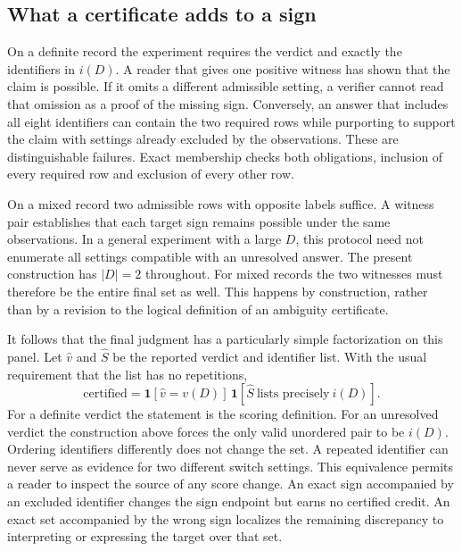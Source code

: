 \documentclass[12pt,letterpaper]{article}
\begin{document}
\subsection{What a certificate adds to a sign}

On a definite record the experiment requires the verdict and exactly the identifiers in $i(D)$. A reader that gives one positive witness has shown that the claim is possible. If it omits a different admissible setting, a verifier cannot read that omission as a proof of the missing sign. Conversely, an answer that includes all eight identifiers can contain the two required rows while purporting to support the claim with settings already excluded by the observations. These are distinguishable failures. Exact membership checks both obligations, inclusion of every required row and exclusion of every other row.

On a mixed record two admissible rows with opposite labels suffice. A witness pair establishes that each target sign remains possible under the same observations. In a general experiment with a large $D$, this protocol need not enumerate all settings compatible with an unresolved answer. The present construction has $|D|=2$ throughout. For mixed records the two witnesses must therefore be the entire final set as well. This happens by construction, rather than by a revision to the logical definition of an ambiguity certificate.

It follows that the final judgment has a particularly simple factorization on this panel. Let $\widehat v$ and $\widehat S$ be the reported verdict and identifier list. With the usual requirement that the list has no repetitions,
\begin{equation}
 \mathrm{certified}
  =\mathbf 1[\widehat v=v(D)]\,\mathbf 1[\widehat S\ \text{lists precisely}\ i(D)] .
 \label{eq:factor}
\end{equation}
For a definite verdict the statement is the scoring definition. For an unresolved verdict the construction above forces the only valid unordered pair to be $i(D)$. Ordering identifiers differently does not change the set. A repeated identifier can never serve as evidence for two different switch settings. This equivalence permits a reader to inspect the source of any score change. An exact sign accompanied by an excluded identifier changes the sign endpoint but earns no certified credit. An exact set accompanied by the wrong sign localizes the remaining discrepancy to interpreting or expressing the target over that set.
\end{document}
